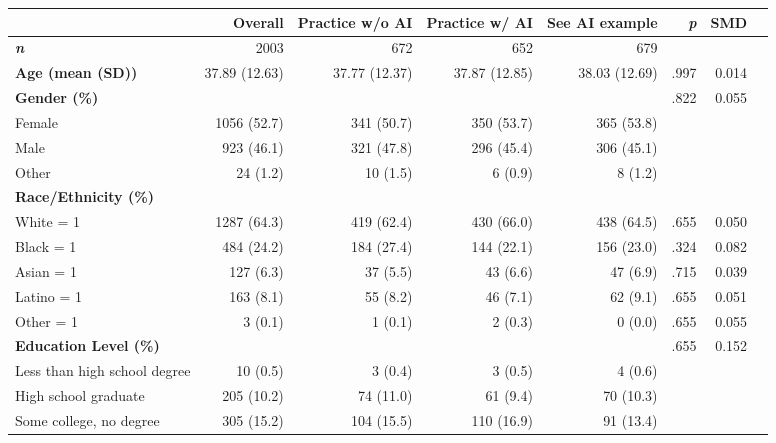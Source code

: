 \documentclass[11pt]{report}
\begin{document}
\begin{append}
\begin{table}[ht]
\begin{tabular}{lrrrrrrr}
\toprule
\multicolumn{1}{l}{} & Overall & Practice w/o AI & Practice w/ AI & See AI example & \textit{p} & SMD \\ 
\midrule\addlinespace[2.5pt]
\textit{\textbf{n}} & 2003 & 672 & 652 & 679 &  &   \\ 
\textbf{Age (mean (SD))} & 37.89 (12.63) & 37.77 (12.37) & 37.87 (12.85) & 38.03 (12.69) & .997  &  0.014 \\ 
\textbf{Gender (\%)} &  &   &   &   & .822 &   0.055 \\ 
\hspace{1em}   Female & 1056 (52.7) & 341 (50.7) & 350 (53.7) & 365 (53.8) &  &  \\ 
\hspace{1em}   Male & 923 (46.1) & 321 (47.8) & 296 (45.4) & 306 (45.1) &  &  \\ 
\hspace{1em}   Other & 24 (1.2) & 10 (1.5) & 6 (0.9) & 8 (1.2) &  &  \\ 
\textbf{Race/Ethnicity (\%)} &  &   &   &   &  &  \\ 
\hspace{1em}White = 1 & 1287 (64.3) & 419 (62.4) & 430 (66.0) & 438 (64.5) & .655 & 0.050 \\ 
\hspace{1em}Black = 1 & 484 (24.2) & 184 (27.4) & 144 (22.1) & 156 (23.0) & .324 & 0.082 \\ 
\hspace{1em}Asian = 1 & 127 (6.3) & 37 (5.5) & 43 (6.6) & 47 (6.9) & .715 & 0.039 \\ 
\hspace{1em}Latino = 1 & 163 (8.1) & 55 (8.2) & 46 (7.1) & 62 (9.1) & .655 & 0.051 \\
\hspace{1em}Other = 1 & 3 (0.1) & 1 (0.1) & 2 (0.3) & 0 (0.0) & .655 & 0.055 \\ 
\textbf{Education Level (\%)} &  &   &   &   & .655 & 0.152 \\ 
\hspace{1em}Less than high school degree & 10 (0.5) & 3 (0.4) & 3 (0.5) & 4 (0.6) & &  \\ 
\hspace{1em}High school graduate & 205 (10.2) & 74 (11.0) & 61 (9.4) & 70 (10.3) & &  \\ 
\hspace{1em}Some college, no degree & 305 (15.2) & 104 (15.5) & 110 (16.9) & 91 (13.4) & &  \\ 

\end{tabular}
\end{table}
\end{append}
\end{document}
